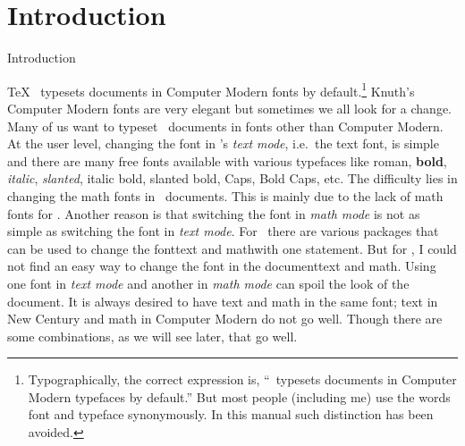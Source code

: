 {{{}
 







\newpage{}\footline{\centerline{\foliofont\folio}}
{}
\cl{\textcolor{sectioncolor}{\sectionfont Contents}}


{\parskip0pt\bs\bs
\readtocfile}



























\section{Introduction}{Introduction}


\hbox{ \TeX\ }\vskip-14.5mm\ii {} typesets documents in Computer Modern fonts by default.\footnote{Typographically, the correct expression is, ``\capstex\ typesets documents in Computer Modern typefaces by default.'' But most people (including me) use the words {\eightit font\/} and {\eightit typeface\/} synonymously. In this manual such distinction has been avoided.} Knuth's Computer Modern fonts are very elegant but sometimes we all look for a change. Many of us want to typeset \capstex\ documents in fonts other than Computer Modern. At the user level, changing the font in \capstex's {\sl text mode}, i.e.\ the text font, is simple and there are many free fonts available with various typefaces like {\rm roman}, {\bf bold}, {\it italic}, {\sl slanted}, {\itbf italic bold}, {\slbf slanted bold}, {\caps Caps}, {\capsbf Bold Caps}, etc. The difficulty lies in changing the math fonts in \capstex\ documents. This is mainly due to the lack of math fonts for \capstex. Another reason is that switching the font in {\sl math mode\/} is not as simple as switching the font in {\sl text mode}. For \capslatex\ there are various packages that can be used to change the font\emdash text and math\emdash with one statement. But for \capstex, I could not find an easy way to change the font in the document\emdash text and math. Using one font in {\sl text mode\/} and another in {\sl math mode\/} can spoil the look of the document. It is always desired to have text and math in the same font; text in New Century and math in Computer Modern do not go well. Though there are some combinations, as we will see later, that go well.

}}
